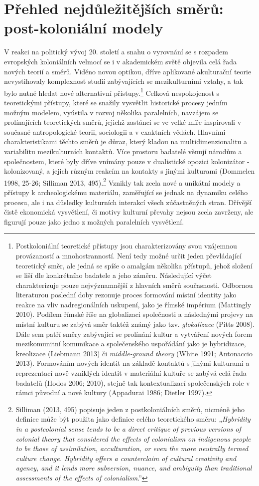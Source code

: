 
\section[přehled-nejdůležitějších-směrů-post-koloniální-modely]{Přehled nejdůležitějších směrů: post-koloniální modely}

V reakci na politický vývoj 20. století a snahu o vyrovnání se s rozpadem evropských koloniálních velmocí se i v akademickém světě objevila celá řada nových teorií a směrů. Viděno novou optikou, dříve aplikované akulturační teorie nevystihovaly komplexnost studií zabývajících se mezikulturními vztahy, a tak bylo nutné hledat nové alternativní přístupy.\footnote{Postkoloniální teoretické přístupy jsou charakterizovány svou vzájemnou provázaností a mnohostranností. Není tedy možné určit jeden převládající teoretický směr, ale jedná se spíše o amalgám několika přístupů, jehož složení se liší dle konkrétního badatele a jeho záměru. Následující výčet charakterizuje pouze nejvýznamnější z hlavních směrů současnosti. Odbornou literaturou poslední doby rezonuje proces formování místní identity jako reakce na vliv nadregionálních uskupení, jako je římské impérium (Mattingly 2010). Podílem římské říše na globalizaci společnosti a následnými projevy na místní kulturu se zabývá směr taktéž známý jako tzv. {\em glokalizace} (Pitts 2008). Dále sem patří směry zabývající se prolínání kultur a vytváření nových forem mezikomunitní komunikace a společenského uspořádání jako je hybridizace, kreolizace (Liebmann 2013) či {\em middle-ground theory} (White 1991; Antonaccio 2013). Formováním nových identit na základě kontaktů s jinými kulturami a reprezentací nově vzniklých identit v materiální kultuře se zabývá celá řada badatelů (Hodos 2006; 2010), stejně tak kontextualizací společenských role v rámci původní a nové kultury (Appadurai 1986; Dietler 1997).} Celková nespokojenost s teoretickými přístupy, které se snažily vysvětlit historické procesy jedním možným modelem, vyústila v rozvoj několika paralelních, navzájem se prolínajících teoretických směrů, jejichž zastánci se ve velké míře inspirovali v současné antropologické teorii, sociologii a v exaktních vědách. Hlavními charakteristikami těchto směrů je důraz, který kladou na multidimenzionalitu a variabilitu mezikulturních kontaktů. Více prostoru badatelé věnují národům a společnostem, které byly dříve vnímány pouze v dualistické opozici kolonizátor - kolonizovaný, a jejich různým reakcím na kontakty s jinými kulturami (Dommelen 1998, 25-26; Silliman 2013, 495).\footnote{Silliman (2013, 495) popisuje jeden z postkoloniálních směrů, nicméně jeho definice může být použita jako definice celého teoretického směru: „{\em Hybridity in a postcolonial sense tends to be a direct critique of previous versions of colonial theory that considered the effects of colonialism on indigenous people to be those of assimilation, acculturation, or even the more neutrally termed culture change. Hybridity offers a counterclaim of cultural creativity and agency, and it lends more subversion, nuance, and ambiguity than traditional assessments of the effects of colonialism}.”} Vznikly tak zcela nové a unikátní modely a přístupy k archeologickému materiálu, zaměřující se jednak na dynamiku celého procesu, ale i na důsledky kulturních interakcí všech zúčastněných stran. Dřívější čistě ekonomická vysvětlení, či motivy kulturní převahy nejsou zcela zavrženy, ale figurují pouze jako jedno z možných paralelních vysvětlení.

